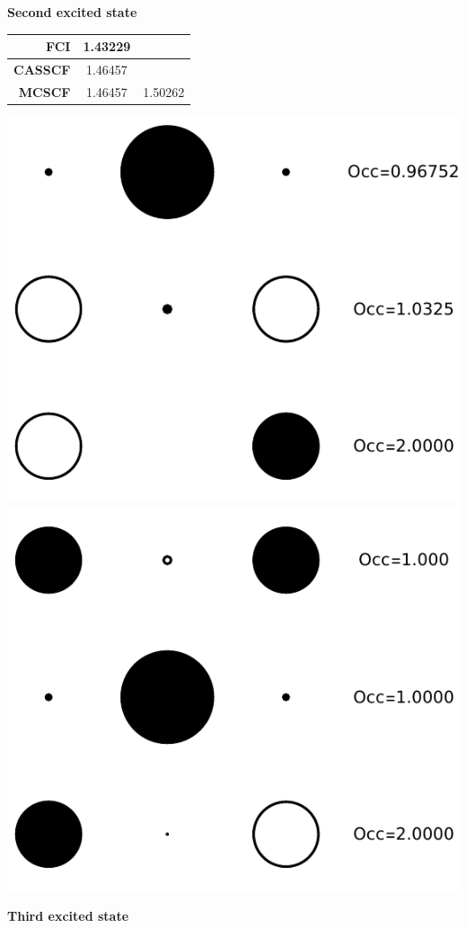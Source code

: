 \documentclass[11pt,a4paper]{article}
\begin{document}
\textbf{Second excited state}

\begin{minipage}{0.3\textwidth}
  \centering
  \begin{tabular}{r|c c}
      \textbf{FCI} & 1.43229 & \\
      \hline
      \textbf{CASSCF} & 1.46457 & \\
      \hline
      \textbf{MCSCF} & 1.46457 & 1.50262
    \end{tabular}
\end{minipage}
\hfill
\begin{minipage}{0.6\textwidth}
  \centering
  \includegraphics[width=0.49\linewidth]{Figures/H3_ES2_CAS_NO}
  \includegraphics[width=0.49\linewidth]{Figures/H3_ES2_MC_NO}
  \label{fig:H3_ES2_NO}
\end{minipage}

\textbf{Third excited state}
\end{document}
